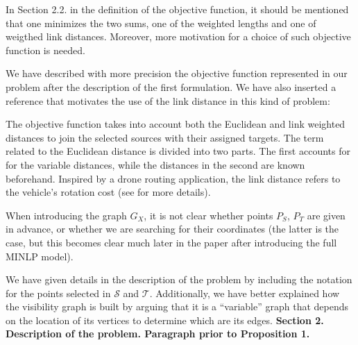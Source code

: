 \documentclass{article}
\newenvironment{reviewer}{\setcounter{pointcounter}{1}}{}
\newcommand{\point}{\text{{\selectfont \thepointcounter} \stepcounter{pointcounter}}}
\begin{document}
\begin{reviewer}
		\begin{itshape}
			In Section 2.2. in the definition of the objective function, it should be mentioned that one minimizes the two sums, one of the weighted lengths and one of weigthed link distances. Moreover, more motivation for a choice of such objective function is needed.
		\end{itshape}
		
		\begin{tcolorbox}[breakable,enhanced,coltitle=black,colback=green!5!white,colframe=green!75!black,title=\textbf{Answer R2.\point},borderline={1pt}{0pt}{black},boxrule=0pt]
			We have described with more precision the objective function represented in our problem after the description of the first formulation. We have also inserted a reference that motivates the use of the link distance in this kind of problem:\medskip
			
			The objective function takes into account both the Euclidean and link weighted distances to join the selected sources with their assigned targets. The term related to the Euclidean distance is divided into two parts. The first accounts for {\color{red} for} the variable distances, while the distances in the second are known beforehand. Inspired by a drone routing application, the link distance refers to the vehicle's rotation cost (see \cite{maheshwari2000} for more details).
			
		\end{tcolorbox}
	
		\begin{itshape}
			When introducing the graph $G_X$, it is not clear whether points $P_S$, $P_T$ are given in advance, or whether we are searching for their coordinates (the latter is the case, but this becomes clear much later in the paper after introducing the full MINLP model). 
		\end{itshape}
	
		\begin{tcolorbox}[breakable,enhanced,coltitle=black,colback=green!5!white,colframe=green!75!black,title=\textbf{Answer R2.\point},borderline={1pt}{0pt}{black},boxrule=0pt]
			We have given details in the description of the problem by including the notation for the points selected in $\mathcal S$ and $\mathcal T$. Additionally, we have better explained how the visibility graph is built by arguing that it is a ``variable'' graph that depends on the location of its vertices to determine which are its edges. \textbf{Section 2. Description of the problem. Paragraph prior to Proposition 1.}
		\end{tcolorbox}
		

\end{reviewer}
\end{document}
